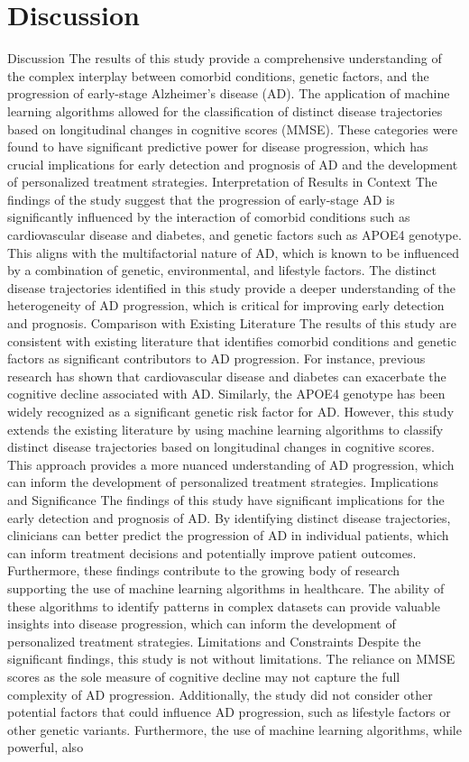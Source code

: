 \documentclass[conference]{IEEEtran}
\begin{document}
\section{Discussion}
Discussion The results of this study provide a comprehensive understanding of the complex interplay between comorbid conditions, genetic factors, and the progression of early-stage Alzheimer's disease (AD). The application of machine learning algorithms allowed for the classification of distinct disease trajectories based on longitudinal changes in cognitive scores (MMSE). These categories were found to have significant predictive power for disease progression, which has crucial implications for early detection and prognosis of AD and the development of personalized treatment strategies. Interpretation of Results in Context The findings of the study suggest that the progression of early-stage AD is significantly influenced by the interaction of comorbid conditions such as cardiovascular disease and diabetes, and genetic factors such as APOE4 genotype. This aligns with the multifactorial nature of AD, which is known to be influenced by a combination of genetic, environmental, and lifestyle factors. The distinct disease trajectories identified in this study provide a deeper understanding of the heterogeneity of AD progression, which is critical for improving early detection and prognosis. Comparison with Existing Literature The results of this study are consistent with existing literature that identifies comorbid conditions and genetic factors as significant contributors to AD progression. For instance, previous research has shown that cardiovascular disease and diabetes can exacerbate the cognitive decline associated with AD. Similarly, the APOE4 genotype has been widely recognized as a significant genetic risk factor for AD. However, this study extends the existing literature by using machine learning algorithms to classify distinct disease trajectories based on longitudinal changes in cognitive scores. This approach provides a more nuanced understanding of AD progression, which can inform the development of personalized treatment strategies. Implications and Significance The findings of this study have significant implications for the early detection and prognosis of AD. By identifying distinct disease trajectories, clinicians can better predict the progression of AD in individual patients, which can inform treatment decisions and potentially improve patient outcomes. Furthermore, these findings contribute to the growing body of research supporting the use of machine learning algorithms in healthcare. The ability of these algorithms to identify patterns in complex datasets can provide valuable insights into disease progression, which can inform the development of personalized treatment strategies. Limitations and Constraints Despite the significant findings, this study is not without limitations. The reliance on MMSE scores as the sole measure of cognitive decline may not capture the full complexity of AD progression. Additionally, the study did not consider other potential factors that could influence AD progression, such as lifestyle factors or other genetic variants. Furthermore, the use of machine learning algorithms, while powerful, also 
\end{document}
